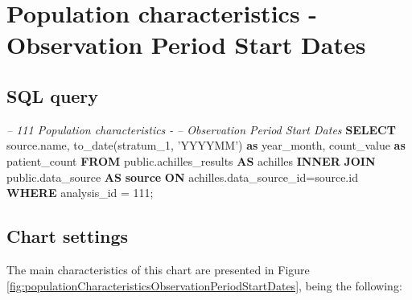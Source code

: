 \documentclass[]{book}
\newenvironment{Shaded}{\begin{snugshade}}{\end{snugshade}}
\newcommand{\KeywordTok}[1]{\textcolor[rgb]{0.13,0.29,0.53}{\textbf{#1}}}
\newcommand{\DecValTok}[1]{\textcolor[rgb]{0.00,0.00,0.81}{#1}}
\newcommand{\StringTok}[1]{\textcolor[rgb]{0.31,0.60,0.02}{#1}}
\newcommand{\CommentTok}[1]{\textcolor[rgb]{0.56,0.35,0.01}{\textit{#1}}}
\newcommand{\FunctionTok}[1]{\textcolor[rgb]{0.00,0.00,0.00}{#1}}
\newcommand{\NormalTok}[1]{#1}
\begin{document}
\section{Population characteristics - Observation Period Start
Dates}\label{population-characteristics---observation-period-start-dates}

\subsection{SQL query}\label{sql-query-12}

\begin{Shaded}
\begin{Highlighting}[]
\CommentTok{-- 111  Population characteristics - }
\CommentTok{--      Observation Period Start Dates}
\KeywordTok{SELECT}\NormalTok{ source.name,}
       \FunctionTok{to_date}\NormalTok{(stratum_1, }\StringTok{'YYYYMM'}\NormalTok{) }\KeywordTok{as}\NormalTok{ year_month,}
\NormalTok{       count_value }\KeywordTok{as}\NormalTok{ patient_count}
\KeywordTok{FROM}\NormalTok{ public.achilles_results }\KeywordTok{AS}\NormalTok{ achilles }
    \KeywordTok{INNER} \KeywordTok{JOIN}\NormalTok{ public.data_source }\KeywordTok{AS} \KeywordTok{source} \KeywordTok{ON} 
\NormalTok{      achilles.data_source_id=source.id}
\KeywordTok{WHERE}\NormalTok{ analysis_id = }\DecValTok{111}\NormalTok{;}
\end{Highlighting}
\end{Shaded}

\subsection{Chart settings}\label{chart-settings-12}

The main characteristics of this chart are presented in Figure
\ref{fig:populationCharacteristicsObservationPeriodStartDates}, being
the following:
\end{document}
